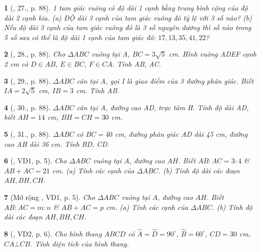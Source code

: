 \documentclass{article}
\newtheorem{baitoan}{}
\begin{document}
\begin{baitoan}[\cite{Binh_Toan_9_tap_1}, 27., p. 88]
	1 tam giác vuông có độ dài 1 cạnh bằng trung bình cộng của độ dài 2 cạnh kia. (a) ĐỘ dài 3 cạnh của tam giác vuông đó tỷ lệ với 3 số nào? (b) Nếu độ dài 3 cạnh của tam giác vuông đó là 3 số nguyên dương thì số nào trong 5 số sau có thể là độ dài 1 cạnh của tam giác đó: $17,13,35,41,22$?
\end{baitoan}

\begin{baitoan}[\cite{Binh_Toan_9_tap_1}, 28., p. 88]
	Cho $\Delta ABC$ vuông tại A, $BC = 3\sqrt{5}$ {\rm cm}. Hình vuông ADEF cạnh {\rm2 cm} có $D\in AB$, $E\in BC$, $F\in CA$. Tính AB, AC.
\end{baitoan}

\begin{baitoan}[\cite{Binh_Toan_9_tap_1}, 29., p. 88]
	$\Delta ABC$ cân tại A, gọi I là giao điểm của 3 đường phân giác. Biết $IA = 2\sqrt{5}$ {\rm cm}, $IB = 3$ {\rm cm}. Tính AB.
\end{baitoan}

\begin{baitoan}[\cite{Binh_Toan_9_tap_1}, 30., p. 88]
	$\Delta ABC$ cân tại A, đường cao AD, trực tâm H. Tính độ dài AD, biết $AH = 14$ {\rm cm}, $BH = CH = 30$ {\rm cm}.
\end{baitoan}

\begin{baitoan}[\cite{Binh_Toan_9_tap_1}, 31., p. 88]
	$\Delta ABC$ có $BC = 40$ {\rm cm}, đường phân giác AD dài {\rm45 cm}, đường cao AH dài {\rm36 cm}. Tính BD, CD.
\end{baitoan}

\begin{baitoan}[\cite{TLCT_THCS_Toan_9_hinh_hoc}, VD1, p. 5]
	Cho $\Delta ABC$ vuông tại $A$, đường cao $AH$. Biết $AB:AC = 3:4$ \& $AB + AC = 21$ \emph{cm}. (a) Tính các cạnh của $\Delta ABC$. (b) Tính độ dài các đoạn $AH,BH,CH$.
\end{baitoan}

\begin{baitoan}[Mở rộng \cite{TLCT_THCS_Toan_9_hinh_hoc}, VD1, p. 5]
	Cho $\Delta ABC$ vuông tại $A$, đường cao $AH$. Biết $AB:AC = m:n$ \& $AB + AC = p$ \emph{cm}. (a) Tính các cạnh của $\Delta ABC$. (b) Tính độ dài các đoạn $AH,BH,CH$.
\end{baitoan}

\begin{baitoan}[\cite{TLCT_THCS_Toan_9_hinh_hoc}, VD2, p. 6]
	Cho hình thang $ABCD$ có $\widehat{A} = \widehat{D} = 90^\circ$, $\widehat{B} = 60^\circ$, $CD = 30$ \emph{cm}, $CA\bot CB$. Tính diện tích của hình thang.
\end{baitoan}
\end{document}
